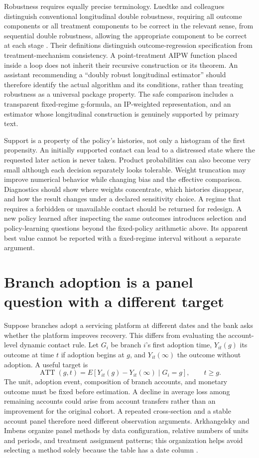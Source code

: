 Robustness requires equally precise terminology. Luedtke and colleagues
distinguish conventional longitudinal double robustness, requiring all outcome
components or all treatment components to be correct in the relevant sense,
from sequential double robustness, allowing the appropriate component to be
correct at each stage \cite{sequentialdr2018}. Their definitions distinguish
outcome-regression specification from treatment-mechanism consistency. A
point-treatment AIPW function placed inside a loop does not inherit their
recursive construction or its theorem. An assistant recommending a
``doubly robust longitudinal estimator'' should therefore identify the actual
algorithm and its conditions, rather than treating robustness as a universal
package property. The safe comparison includes a transparent fixed-regime
g-formula, an IP-weighted representation, and an estimator whose longitudinal
construction is genuinely supported by primary text.

Support is a property of the policy's histories, not only a histogram of the
first propensity. An initially supported contact can lead to a distressed
state where the requested later action is never taken. Product probabilities
can also become very small although each decision separately looks tolerable.
Weight truncation may improve numerical behavior while changing bias and the
effective comparison. Diagnostics should show where weights concentrate,
which histories disappear, and how the result changes under a declared
sensitivity choice. A regime that requires a forbidden or unavailable contact
should be returned for redesign. A new policy learned after inspecting the
same outcomes introduces selection and policy-learning questions beyond the
fixed-policy arithmetic above. Its apparent best value cannot be reported
with a fixed-regime interval without a separate argument.

\section{Branch adoption is a panel question with a different target}
\label{exec14:l5-panel}

Suppose branches adopt a servicing platform at different dates and the bank
asks whether the platform improves recovery. This differs from evaluating the
account-level dynamic contact rule. Let $G_i$ be branch $i$'s first adoption
time, $Y_{it}(g)$ its outcome at time $t$ if adoption begins at $g$, and
$Y_{it}(\infty)$ the outcome without adoption. A useful target is
\[
 \operatorname{ATT}(g,t)
 =E[Y_{it}(g)-Y_{it}(\infty)\mid G_i=g],\qquad t\geq g.
\]
The unit, adoption event, composition of branch accounts, and monetary outcome
must be fixed before estimation. A decline in average loss among remaining
accounts could arise from account transfers rather than an improvement for
the original cohort. A repeated cross-section and a stable account panel
therefore need different observation arguments. Arkhangelsky and Imbens
organize panel methods by data configuration, relative numbers of units and
periods, and treatment assignment patterns; this organization helps avoid
selecting a method solely because the table has a date column
\cite{panelreview2024}.

